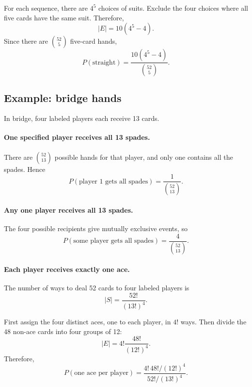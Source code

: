 \documentclass[11pt]{article}
\begin{document}
For each sequence, there are $4^5$ choices of suits. Exclude the
four choices where all five cards have the same suit. Therefore,
\[
|E|=10(4^5-4).
\]
Since there are $\binom{52}{5}$ five-card hands,
\[
\boxed{
P(\text{straight})
=\frac{10(4^5-4)}{\binom{52}{5}}.
}
\]

\subsection{Example: bridge hands}

In bridge, four labeled players each receive 13 cards.

\paragraph{One specified player receives all 13 spades.}
There are $\binom{52}{13}$ possible hands for that player, and only
one contains all the spades. Hence
\[
P(\text{player 1 gets all spades})
=\frac{1}{\binom{52}{13}}.
\]

\paragraph{Any one player receives all 13 spades.}
The four possible recipients give mutually exclusive events, so
\[
\boxed{
P(\text{some player gets all spades})
=\frac{4}{\binom{52}{13}}.
}
\]

\paragraph{Each player receives exactly one ace.}
The number of ways to deal 52 cards to four labeled players is
\[
|S|=\frac{52!}{(13!)^4}.
\]

First assign the four distinct aces, one to each player, in $4!$
ways. Then divide the 48 non-ace cards into four groups of 12:
\[
|E|=4!\frac{48!}{(12!)^4}.
\]
Therefore,
\[
\boxed{
P(\text{one ace per player})
=\frac{4!\,48!/(12!)^4}{52!/(13!)^4}.
}
\]
\end{document}
